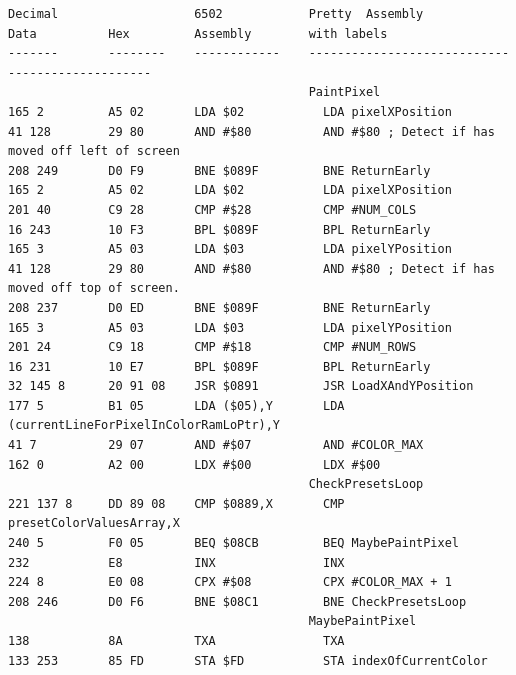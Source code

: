 \lstset{style=6502Style}
\begin{lstlisting}[basicstyle=\tiny]
Decimal                   6502            Pretty  Assembly
Data          Hex         Assembly        with labels
-------       --------    ------------    ------------------------------------------------
                                          PaintPixel                                       
165 2         A5 02       LDA $02           LDA pixelXPosition                               
41 128        29 80       AND #$80          AND #$80 ; Detect if has moved off left of screen
208 249       D0 F9       BNE $089F         BNE ReturnEarly                                  
165 2         A5 02       LDA $02           LDA pixelXPosition                               
201 40        C9 28       CMP #$28          CMP #NUM_COLS                                    
16 243        10 F3       BPL $089F         BPL ReturnEarly                                  
165 3         A5 03       LDA $03           LDA pixelYPosition                               
41 128        29 80       AND #$80          AND #$80 ; Detect if has moved off top of screen.
208 237       D0 ED       BNE $089F         BNE ReturnEarly                                  
165 3         A5 03       LDA $03           LDA pixelYPosition                               
201 24        C9 18       CMP #$18          CMP #NUM_ROWS                                    
16 231        10 E7       BPL $089F         BPL ReturnEarly                                  
32 145 8      20 91 08    JSR $0891         JSR LoadXAndYPosition                            
177 5         B1 05       LDA ($05),Y       LDA (currentLineForPixelInColorRamLoPtr),Y       
41 7          29 07       AND #$07          AND #COLOR_MAX                                   
162 0         A2 00       LDX #$00          LDX #$00                                         
                                          CheckPresetsLoop
221 137 8     DD 89 08    CMP $0889,X       CMP presetColorValuesArray,X             
240 5         F0 05       BEQ $08CB         BEQ MaybePaintPixel                                        
232           E8          INX               INX                                              
224 8         E0 08       CPX #$08          CPX #COLOR_MAX + 1                               
208 246       D0 F6       BNE $08C1         BNE CheckPresetsLoop                                        
                                          MaybePaintPixel   
138           8A          TXA               TXA                                      
133 253       85 FD       STA $FD           STA indexOfCurrentColor                          

\end{lstlisting}
